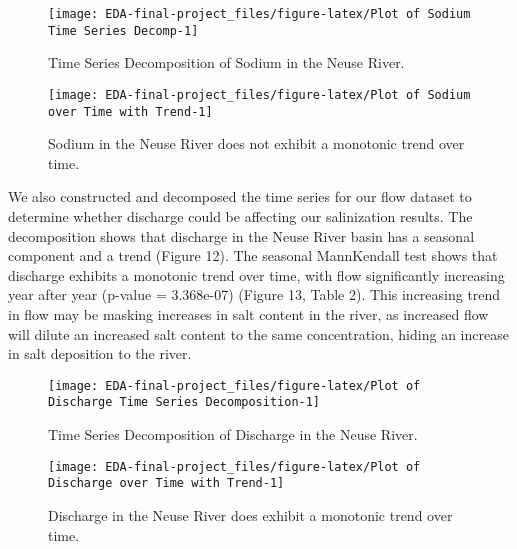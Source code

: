 \documentclass[
  12pt,
]{article}
\begin{document}
\begin{figure}

{\centering \texttt{[image: EDA-final-project\_files/figure-latex/Plot of Sodium Time Series Decomp-1]} 

}

\caption{Time Series Decomposition of Sodium in the Neuse River.}\label{fig:Plot of Sodium Time Series Decomp}
\end{figure}

\begin{figure}

{\centering \texttt{[image: EDA-final-project\_files/figure-latex/Plot of Sodium over Time with Trend-1]} 

}

\caption{Sodium in the Neuse River does not exhibit a monotonic trend over time.}\label{fig:Plot of Sodium over Time with Trend}
\end{figure}

\newpage

We also constructed and decomposed the time series for our flow dataset
to determine whether discharge could be affecting our salinization
results. The decomposition shows that discharge in the Neuse River basin
has a seasonal component and a trend (Figure 12). The seasonal
MannKendall test shows that discharge exhibits a monotonic trend over
time, with flow significantly increasing year after year (p-value =
3.368e-07) (Figure 13, Table 2). This increasing trend in flow may be
masking increases in salt content in the river, as increased flow will
dilute an increased salt content to the same concentration, hiding an
increase in salt deposition to the river.

\begin{figure}

{\centering \texttt{[image: EDA-final-project\_files/figure-latex/Plot of Discharge Time Series Decomposition-1]} 

}

\caption{Time Series Decomposition of Discharge in the Neuse River.}\label{fig:Plot of Discharge Time Series Decomposition}
\end{figure}

\begin{figure}

{\centering \texttt{[image: EDA-final-project\_files/figure-latex/Plot of Discharge over Time with Trend-1]} 

}

\caption{Discharge in the Neuse River does exhibit a monotonic trend over time.}\label{fig:Plot of Discharge over Time with Trend}
\end{figure}
\end{document}
